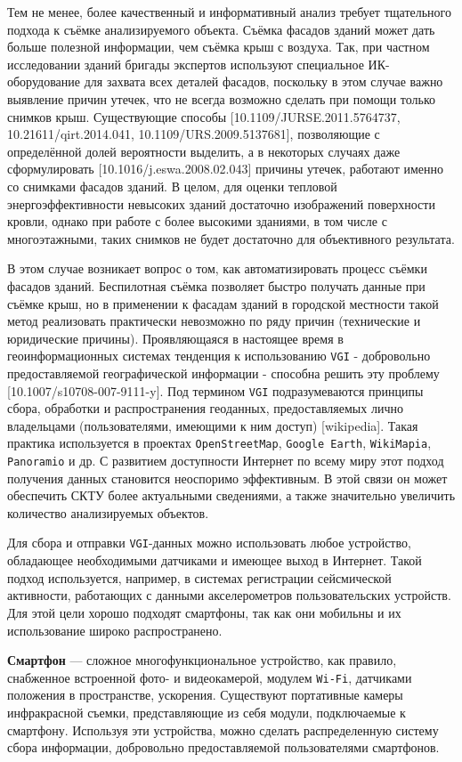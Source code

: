 	Тем не менее, более качественный и информативный анализ требует тщательного подхода к съёмке анализируемого объекта. Съёмка фасадов зданий может дать больше полезной информации, чем съёмка крыш с воздуха. Так, при частном исследовании зданий бригады экспертов используют специальное ИК-оборудование для захвата всех деталей фасадов, поскольку в этом случае важно выявление причин утечек, что не всегда возможно сделать при помощи только снимков крыш. Существующие способы [10.1109/JURSE.2011.5764737, 10.21611/qirt.2014.041, 10.1109/URS.2009.5137681], позволяющие с определённой долей вероятности выделить, а в некоторых случаях даже сформулировать [10.1016/j.eswa.2008.02.043] причины утечек, работают именно со снимками фасадов зданий. В целом, для оценки тепловой энергоэффективности невысоких зданий достаточно изображений поверхности кровли, однако при работе с более высокими зданиями, в том числе с многоэтажными, таких снимков не будет достаточно для объективного результата. 

	В этом случае возникает вопрос о том, как автоматизировать процесс съёмки фасадов зданий. Беспилотная съёмка позволяет быстро получать данные при съёмке крыш, но в применении к фасадам зданий в городской местности такой метод реализовать практически невозможно по ряду причин (технические и юридические причины). Проявляющаяся в настоящее время в геоинформационных системах тенденция к использованию \texttt{VGI} - добровольно предоставляемой географической информации - способна решить эту проблему [10.1007/s10708-007-9111-y]. Под термином \texttt{VGI} подразумеваются принципы сбора, обработки и распространения геоданных, предоставляемых лично владельцами (пользователями, имеющими к ним доступ) [wikipedia]. Такая практика используется в проектах \texttt{OpenStreetMap}, \texttt{Google Earth}, \texttt{WikiMapia}, \texttt{Panoramio} и др. С развитием доступности Интернет по всему миру этот подход получения данных становится неоспоримо эффективным. В этой связи он может обеспечить СКТУ более актуальными сведениями, а также значительно увеличить количество анализируемых объектов. 

	Для сбора и отправки \texttt{VGI}-данных можно использовать любое устройство, обладающее необходимыми датчиками и имеющее выход в Интернет.  Такой подход используется, например, в системах регистрации сейсмической активности, работающих с данными акселерометров пользовательских устройств. Для этой цели хорошо подходят смартфоны, так как они мобильны и их использование широко распространено.

	\textbf{Смартфон} --- сложное многофункциональное устройство, как правило, снабженное встроенной фото- и видеокамерой, модулем \texttt{Wi-Fi}, датчиками положения в пространстве, ускорения. Существуют портативные камеры инфракрасной съемки, представляющие из себя модули, подключаемые к смартфону. Используя эти устройства, можно сделать распределенную систему сбора информации, добровольно предоставляемой пользователями смартфонов. 


